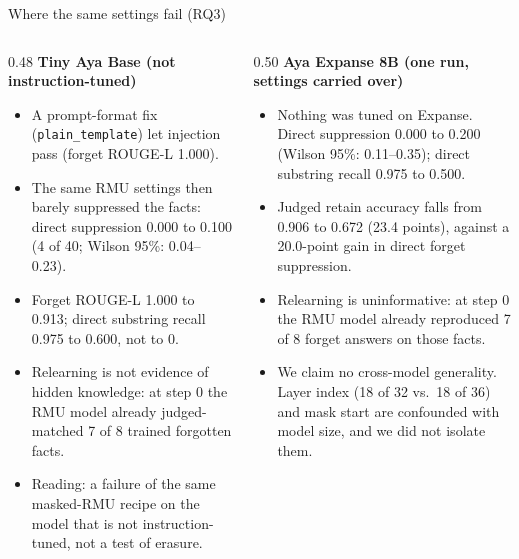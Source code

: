 \documentclass[aspectratio=169,11pt,usepdftitle=false]{beamer}
\newcommand{\code}[1]{\texttt{#1}}
\begin{document}
\begin{frame}{Where the same settings fail (RQ3)}
\begin{columns}[T]
\begin{column}{0.48\textwidth}
\textbf{\small Tiny Aya Base (not instruction-tuned)}\\[3pt]
\scriptsize
\begin{itemize}
\item A prompt-format fix (\code{plain\_template}) let injection pass (forget ROUGE-L 1.000).
\item The same RMU settings then barely suppressed the facts: direct suppression 0.000 to 0.100 (4 of 40; Wilson 95\%: 0.04--0.23).
\item Forget ROUGE-L 1.000 to 0.913; direct substring recall 0.975 to 0.600, not to 0.
\item Relearning is not evidence of hidden knowledge: at step 0 the RMU model already judged-matched 7 of 8 trained forgotten facts.
\item Reading: a failure of the same masked-RMU recipe on the model that is not instruction-tuned, not a test of erasure.
\end{itemize}
\end{column}
\begin{column}{0.50\textwidth}
\textbf{\small Aya Expanse 8B (one run, settings carried over)}\\[3pt]
\scriptsize
\begin{itemize}
\item Nothing was tuned on Expanse. Direct suppression 0.000 to 0.200 (Wilson 95\%: 0.11--0.35); direct substring recall 0.975 to 0.500.
\item Judged retain accuracy falls from 0.906 to 0.672 (23.4 points), against a 20.0-point gain in direct forget suppression.
\item Relearning is uninformative: at step 0 the RMU model already reproduced 7 of 8 forget answers on those facts.
\item We claim no cross-model generality. Layer index (18 of 32 vs.\ 18 of 36) and mask start are confounded with model size, and we did not isolate them.
\end{itemize}
\end{column}
\end{columns}
\end{frame}
\end{document}
